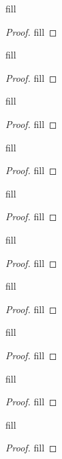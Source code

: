 \begin{exercise}{30}
fill
\end{exercise}
\begin{proof}
fill
\end{proof} 

\begin{exercise}{31}
fill
\end{exercise}
\begin{proof}
fill
\end{proof} 

\begin{exercise}{32}
fill
\end{exercise}
\begin{proof}
fill
\end{proof} 

\begin{exercise}{33}
fill
\end{exercise}
\begin{proof}
fill
\end{proof} 

\begin{exercise}{36}
fill
\end{exercise}
\begin{proof}
fill
\end{proof} 

\begin{exercise}{37}
fill
\end{exercise}
\begin{proof}
fill
\end{proof} 

\begin{exercise}{38}
fill
\end{exercise}
\begin{proof}
fill
\end{proof} 

\begin{exercise}{40}
fill
\end{exercise}
\begin{proof}
fill
\end{proof} 

\begin{exercise}{42}
fill
\end{exercise}
\begin{proof}
fill
\end{proof} 

\begin{exercise}{43}
fill
\end{exercise}
\begin{proof}
fill
\end{proof} 

